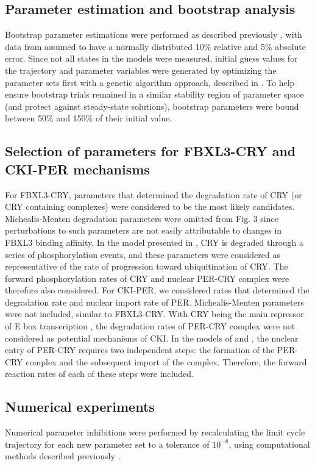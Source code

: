 \subsection{Parameter estimation and bootstrap analysis}
Bootstrap parameter estimations were performed as described previously \cite{St.John2013}, with data from \cite{Lee2001} assumed to have a normally distributed 10\% relative and 5\% absolute error. 
Since not all states in the models were measured, initial guess values for the trajectory and parameter variables were generated by optimizing the parameter sets first with a genetic algorithm approach, described in \cite{Mirsky2009}. 
To help ensure bootstrap trials remained in a similar stability region of parameter space (and protect against steady-state solutions), bootstrap parameters were bound between 50\% and 150\% of their initial value. 

\subsection{Selection of parameters for FBXL3-CRY and CKI-PER mechanisms}
For FBXL3-CRY, parameters that determined the degradation rate of CRY (or CRY containing complexes) were considered to be the most likely candidates. 
Michealis-Menten degradation parameters were omitted from Fig. 
3 since perturbations to such parameters are not easily attributable to changes in FBXL3 binding affinity. 
In the model presented in \cite{Leloup2003}, CRY is degraded through a series of phosphorylation events, and these parameters were considered as representative of the rate of progression toward ubiquitination of CRY. 
The forward phosphorylation rates of CRY and nuclear PER-CRY complex were therefore also considered. 
 For CKI-PER, we considered rates that determined the degradation rate and nuclear import rate of PER. 
Michealis-Menten parameters were not included, similar to FBXL3-CRY. 
With CRY being the main repressor of E box transcription \cite{Ye2011}, the degradation rates of PER-CRY complex were not considered as potential mechanisms of CKI. 
In the models of \cite{Leloup2003} and \cite{Relogio2011}, the nuclear entry of PER-CRY requires two independent steps: the formation of the PER-CRY complex and the subsequent import of the complex. 
Therefore, the forward reaction rates of each of these steps were included. 

\subsection{Numerical experiments}
Numerical parameter inhibitions were performed by recalculating the limit cycle trajectory for each new parameter set to a tolerance of $10^{-8}$, using computational methods described previously \cite{Wilkins2009}.


